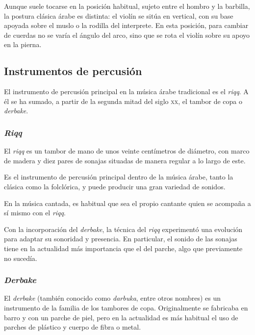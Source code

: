     Aunque suele tocarse en la posición habitual, sujeto entre el hombro y la barbilla, la postura clásica árabe es distinta: el violín se sitúa en vertical, con su base apoyada sobre el muslo o la rodilla del interprete. En esta posición, para cambiar de cuerdas no se varía el ángulo del arco, sino que se rota el violín sobre su apoyo en la pierna.


    \subsection{Instrumentos de percusión}

        El instrumento de percusión principal en la música árabe tradicional es el \emph{riqq}. A él se ha sumado, a partir de la segunda mitad del siglo \textsc{xx}, el tambor de copa o \emph{derbake}.

        \subsubsection{\emph{Riqq}}

        El \emph{riqq} es un tambor de mano de unos veinte centímetros de diámetro, con marco de madera y diez pares de sonajas situadas de manera regular a lo largo de este.

        Es el instrumento de percusión principal dentro de la música árabe, tanto la clásica como la folclórica, y puede producir una gran variedad de sonidos.

        En la música cantada, es habitual que sea el propio cantante quien se acompaña a sí mismo con el \emph{riqq}.

        Con la incorporación del \emph{derbake}, la técnica del \emph{riqq} experimentó una evolución para adaptar su sonoridad y presencia. En particular, el sonido de las sonajas tiene en la actualidad más importancia que el del parche, algo que previamente no sucedía.


        \subsubsection{\emph{Derbake}}

        El \emph{derbake} (también conocido como \emph{darbuka}, entre otros nombres) es un instrumento de la familia de los tambores de copa. Originalmente se fabricaba en barro y con un parche de piel, pero en la actualidad es más habitual el uso de parches de plástico y cuerpo de fibra o metal.

